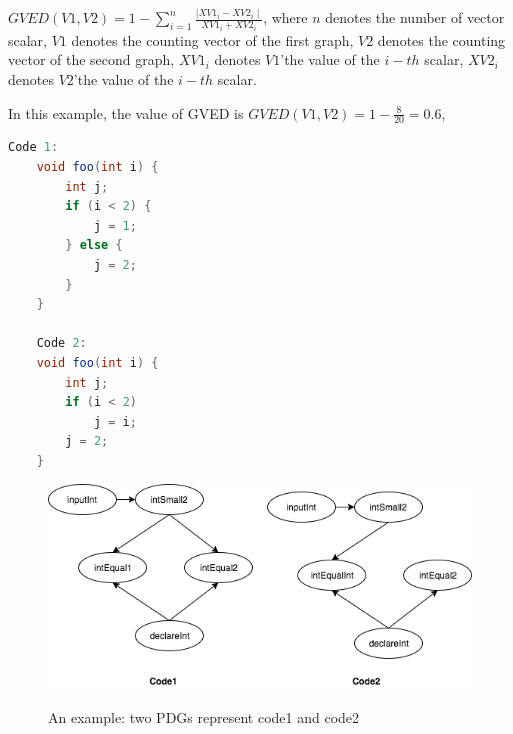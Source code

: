 $GVED\left(V1, V2\right) = 1 - \sum_{i=1}^{n} \frac{ \mid XV1_i - XV2_i \mid}{XV1_i + XV2_i}$, 
where $n$ denotes the number of vector scalar, $V1$ denotes the counting vector of the first graph, $V2$ denotes the counting vector of the second graph, $XV1_i$ denotes $V1$\rq the value of the $i-th$ scalar, $XV2_i$ denotes $V2$\rq the value of the $i-th$ scalar.  

In this example, the value of GVED is $GVED(V1, V2) = 1 - \frac{8 }{20} = 0.6 $,


\begin{lstlisting}[language=JAVA]
	Code 1:
	void foo(int i) {
		int j;
		if (i < 2) {
			j = 1;
		} else {
			j = 2;
		}
	}

	Code 2:
	void foo(int i) {
		int j;
		if (i < 2) 
			j = i;	 
		j = 2;
	}
\end{lstlisting}
\begin{figure}[h]
	\caption{An example: two PDGs represent code1 and code2}
	\includegraphics[scale=0.4]{img/Diagram_PDG.png}
	\centering
	\label{fig:PDGs}
\end{figure}

\begin{table}[htbp]
  \centering
  \caption{Feature table of code1 extracted in Exas}
  \label{tab:feature1}%
\end{table}%

